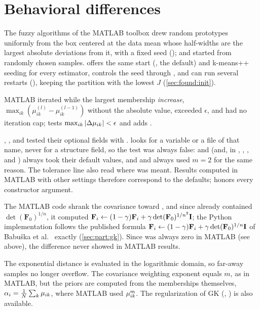 \section{Behavioral differences}

\begin{description}[style=nextline]
\item[Initialization.] The fuzzy algorithms of the MATLAB toolbox drew random prototypes uniformly from the box centered at the data mean whose half-widths are the largest absolute deviations from it, with a fixed seed ();  and  started from randomly chosen samples.  offers the same start (, the default) and k-means++ seeding for every estimator, controls the seed through , and can run several restarts (), keeping the partition with the lowest $J$ (\cref{sec:found:init}).
\item[Termination.] MATLAB iterated while the largest membership \emph{increase}, $\max_{ik}(\mu^{(l)}_{ik}-\mu^{(l-1)}_{ik})$ without the absolute value, exceeded $\epsilon$, and had no iteration cap;  tests $\max_{ik}|\Delta\mu_{ik}|<\epsilon$ and adds .
\item[Optional parameters.] , , and  tested their optional fields with .  looks for a variable or a file of that name, never for a structure field, so the test was always false:  and  (and, in , , , and ) always took their default values, and  and  always used $m=2$ for the same reason. The tolerance line also read  where  was meant. Results computed in MATLAB with other settings therefore correspond to the defaults;  honors every constructor argument.
\item[GK covariance regularization.] The MATLAB code shrank the covariance toward , and since  already contained $\det(\mathbf F_0)^{1/n}$, it computed $\mathbf{F}_i\leftarrow(1-\gamma)\mathbf{F}_i+\gamma\det(\mathbf{F}_0)^{1/n^2}\mathbf{I}$; the Python implementation follows the published formula $\mathbf{F}_i\leftarrow(1-\gamma)\mathbf{F}_i+\gamma\det(\mathbf{F}_0)^{1/n}\mathbf{I}$ of Babu\v{s}ka et al.\ \cite{babuska:2002:covariance} exactly (\cref{sec:part:gk}). Since  was always zero in MATLAB (see above), the difference never showed in MATLAB results.
\item[Gath--Geva.] The exponential distance is evaluated in the logarithmic domain, so far-away samples no longer overflow. The covariance weighting exponent equals $m$, as in MATLAB, but the priors are computed from the memberships themselves, $\alpha_i=\frac1N\sum_k\mu_{ik}$, where MATLAB used $\mu_{ik}^m$. The regularization of GK (, ) is also available.

\end{description}
